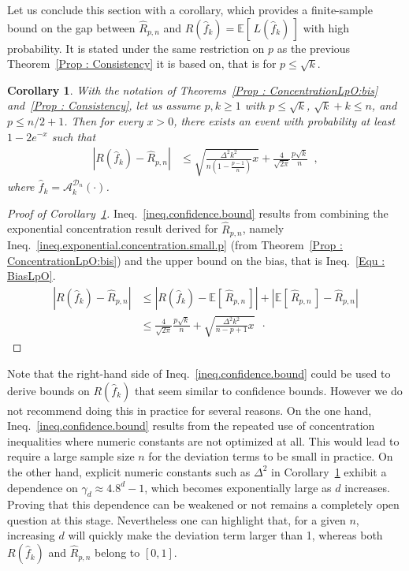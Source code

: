 \documentclass[twoside,11pt]{article}
\numberwithin{equation}{section}
\newtheorem{cor}{Corollary}[section]
\newcommand{\1}{\mathds{1}}%
\newcommand{\paren}[1]{\left( #1 \right)}
\newcommand{\croch}[1]{\left[\, #1 \,\right]}
\newcommand{\abs}[1]{\left\lvert #1 \right\rvert} %
\newcommand{\E}{\mathbb{E}}
\newcommand{\Rh}{\widehat{R}}
\newcommand{\Dn}{\mathcal{D}_n}
\newcommand{\A}{\mathcal{A}}
\numberwithin{equation}{section}
\theoremstyle{plain}
\begin{document}
Let us conclude this section with a corollary, which provides a finite-sample bound on the gap between $\Rh_{p,n}$ and $R(\hat f_k) = \E\croch{L(\hat f_k)}$ with high probability. It is stated under the same restriction on $p$ as the previous Theorem~\ref{Prop : Consistency} it is based on, that is for $p\leq \sqrt{k}$.
%
\begin{cor}\label{Prop : UperBound}
With the notation of Theorems~\ref{Prop : ConcentrationLpO:bis} and~\ref{Prop : Consistency}, let us assume $p,k \geq 1$ with $p \leq \sqrt{k}$, $\sqrt{k}+k\leq n$, and $ p \leq n/2+1$.
%
Then for every $x>0$, there exists an event with probability at least $1 - 2e^{-x}$ such that
\begin{align}\label{ineq.confidence.bound}
\abs{ R( \hat{f}_k ) - \Rh_{p,n}}  & \leq \sqrt{ \frac{\Delta^2 k^2 }{n \paren{1-\frac{p-1}{n}} } x } + \frac{4}{\sqrt{2\pi}}\frac{p\sqrt{k}}{n} \enspace,
\end{align}
where $\hat f_k=\A_k^{\Dn}(\cdot)$.
%
\end{cor}
%
\begin{proof}[Proof of Corollary~\ref{Prop : UperBound}]
	Ineq.~\eqref{ineq.confidence.bound} results from combining
	the exponential concentration result derived for $\Rh_{p,n}$, namely Ineq.~\eqref{ineq.exponential.concentration.small.p} (from Theorem~\ref{Prop : ConcentrationLpO:bis}) and the upper bound on the bias, that is Ineq.~\eqref{Equ : BiasLpO}.
	\begin{align*}
	\abs{  R(\hat{f}_k ) - \Rh_{p,n} } & \leq  \abs{  R(\hat{f}_k ) - \E\croch{ \Rh_{p,n} } } + \abs{ \E\croch{ \Rh_{p,n} } -  \Rh_{p,n} }  \\
	& \leq  \frac{4}{\sqrt{2\pi}}\frac{p\sqrt{k}}{n}  +\sqrt{ \frac{\Delta^2 k^2 }{n-p+1} x }  \enspace\cdot
	\end{align*}
\end{proof}
%
%
Note that the right-hand side of Ineq.~\eqref{ineq.confidence.bound} could be used to derive bounds on $R(\hat f_k)$ that seem similar to confidence bounds.
%
However we do not recommend doing this in practice for several reasons.
%
On the one hand, Ineq.~\eqref{ineq.confidence.bound} results from the repeated use of
concentration inequalities where numeric constants are not optimized at all. This would lead to require a large sample size $n$ for the deviation terms to be small in practice.
%
On the other hand, explicit numeric constants such as $\Delta^2$ in Corollary~\ref{Prop : UperBound} exhibit a dependence on $\gamma_d \approx 4.8^d-1$, which becomes exponentially large as $d$ increases. Proving that this dependence can be weakened or not remains a completely open question at this stage. Nevertheless one can highlight that, for a given $n$, increasing $d$ will quickly make the deviation term larger than 1, whereas both $R(\hat f_k)$ and $\Rh_{p,n}$ belong to $[0,1]$.
\end{document}
